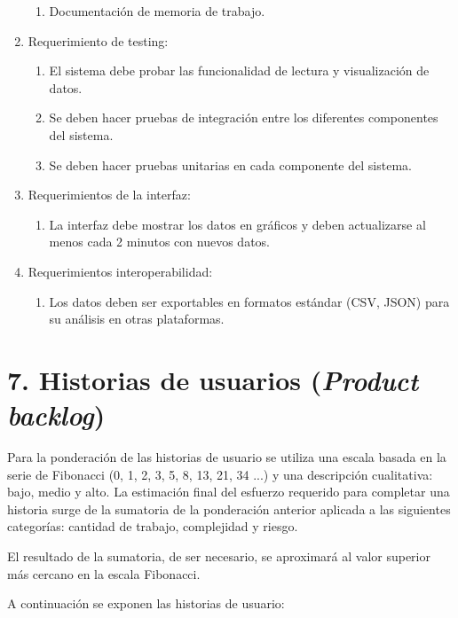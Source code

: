 \documentclass[
11pt, %
]{charter}
\begin{document}
\begin{enumerate}
\begin{enumerate}
			\item Documentación de memoria de trabajo.
		\end{enumerate}
	\item Requerimiento de testing:
		\begin{enumerate}
			\item El sistema debe probar las funcionalidad de lectura y visualización de datos.
			\item Se deben hacer pruebas de integración entre los diferentes componentes del sistema. 
			\item Se deben hacer pruebas unitarias en cada componente del sistema.
		\end{enumerate}
	\item Requerimientos de la interfaz:
		\begin{enumerate}
			\item La interfaz debe mostrar los datos en gráficos y deben actualizarse al menos cada 2 minutos con nuevos datos.
		\end{enumerate}
	\item Requerimientos interoperabilidad:
		\begin{enumerate}
			\item Los datos deben ser exportables en formatos estándar (CSV, JSON) para su análisis en otras plataformas.
		\end{enumerate}
\end{enumerate}

\section{7. Historias de usuarios (\textit{Product backlog})}
\label{sec:backlog}

Para la ponderación de las historias de usuario se utiliza una escala basada en la serie de
Fibonacci (0, 1, 2, 3, 5, 8, 13, 21, 34 ...) y una descripción cualitativa: bajo, medio y alto.
La estimación final del esfuerzo requerido para completar una historia surge de la sumatoria de
la ponderación anterior aplicada a las siguientes categorías: cantidad de trabajo, complejidad
y riesgo. 

El resultado de la sumatoria, de ser necesario, se aproximará al valor superior más
cercano en la escala Fibonacci.

A continuación se exponen las historias de usuario:
\end{document}
